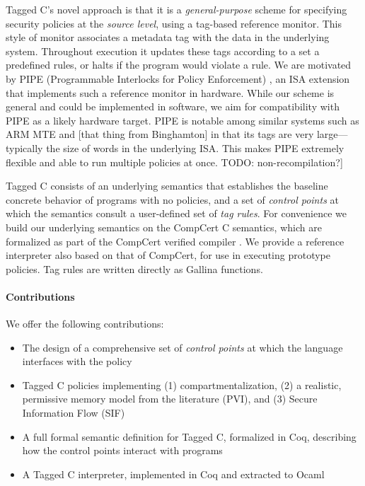 \documentclass{llncs}
\begin{document}
Tagged C's novel approach is that it is a \emph{general-purpose} scheme for specifying security
policies at the \emph{source level}, using a tag-based reference monitor.
This style of monitor associates a metadata tag with the data in the underlying system.
Throughout execution it updates these tags according to a set a predefined rules, or halts if
the program would violate a rule. We are motivated by PIPE (Programmable Interlocks for Policy Enforcement)
\cite{}, an ISA extension that implements such a reference monitor in hardware. 
While our scheme is general and could be implemented in software, we aim for compatibility
with PIPE as a likely hardware target. PIPE is notable among similar systems such as ARM MTE
and [that thing from Binghamton] in that its tags are very large---typically the size of words
in the underlying ISA. This makes PIPE extremely flexible and able to run multiple policies at once.
TODO: non-recompilation?]

Tagged C consists of an underlying semantics that establishes the baseline concrete behavior of programs
with no policies, and a set of {\em control points} at which the semantics consult a user-defined set of
{\em tag rules}. For convenience we build our underlying semantics on the CompCert C semantics, which are formalized 
as part of the CompCert verified compiler \cite{Leroy09:CompCert}. We provide a reference interpreter
also based on that of CompCert, for use in executing prototype policies. Tag rules are written directly as Gallina
functions.

\paragraph{Contributions}

We offer the following contributions:

\begin{itemize}
\item The design of a comprehensive set of {\em control points} at which the language interfaces with the policy
\item Tagged C policies implementing (1) compartmentalization,
  (2) a realistic, permissive memory model from the literature (PVI),
  and (3) Secure Information Flow (SIF)
\item A full formal semantic definition for Tagged C, formalized in Coq, describing how the control points
  interact with programs
\item A Tagged C interpreter, implemented in Coq and extracted to Ocaml
\end{itemize}
\end{document}
